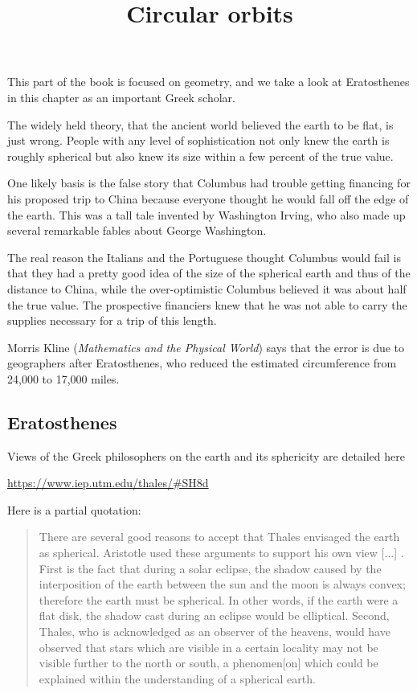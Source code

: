 \documentclass[11pt, oneside]{article}
\title{Circular orbits}
\date{}
\begin{document}
\maketitle
\Large

This part of the book is focused on geometry, and we take a look at Eratosthenes in this chapter as an important Greek scholar.

The widely held theory, that the ancient world believed the earth to be flat, is just wrong.  People with any level of sophistication not only knew the earth is roughly spherical but also knew its size within a few percent of the true value.

One likely basis is the false story that Columbus had trouble getting financing for his proposed trip to China because everyone thought he would fall off the edge of the earth.  This was a tall tale invented by Washington Irving, who also made up several remarkable fables about George Washington.

The real reason the Italians and the Portuguese thought Columbus would fail is that they had a pretty good idea of the size of the spherical earth and thus of the distance to China, while the over-optimistic Columbus believed it was about half the true value.  The prospective financiers knew that he was not able to carry the supplies necessary for a trip of this length.

Morris Kline (\emph{Mathematics and the Physical World}) says that the error is due to geographers after Eratosthenes, who reduced the estimated circumference from 24,000 to 17,000 miles.

\subsection*{Eratosthenes}

Views of the Greek philosophers on the earth and its sphericity are detailed here

\url{https://www.iep.utm.edu/thales/#SH8d}

Here is a partial quotation:

\begin{quote}
There are several good reasons to accept that Thales envisaged the earth as spherical. Aristotle used these arguments to support his own view [...] . First is the fact that during a solar eclipse, the shadow caused by the interposition of the earth between the sun and the moon is always convex; therefore the earth must be spherical. In other words, if the earth were a flat disk, the shadow cast during an eclipse would be elliptical. Second, Thales, who is acknowledged as an observer of the heavens, would have observed that stars which are visible in a certain locality may not be visible further to the north or south, a phenomen[on] which could be explained within the understanding of a spherical earth.
\end{quote}
\end{document}
